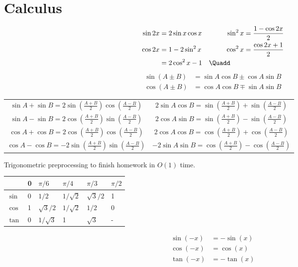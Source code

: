 \section{Calculus}\label{cbe77ad}

\label{c1fe42f}

\begin{alignat*}{3}
  \sin2x & =2\sin x\cos x & \sin^2x          & =\frac{1-\cos2x}2 \\
  \cos2x & =1-2\sin^2x    & \cos^2x          & =\frac{\cos2x+1}2 \\
         & =2\cos^2x-1    & \Quadd\quad\quad &
\end{alignat*}
\begin{align*}
  \sin(A\pm B) &=\sin A\cos B\pm\cos A\sin B \\
  \cos(A\pm B) &=\cos A\cos B\mp\sin A\sin B
\end{align*}
\begin{center}
  \renewcommand{\arraystretch}{1.5}
  \begin{tabular}{c|c}
    $\sin A+\sin B =2\sin(\frac{A+B}2)\cos(\frac{A-B}2)$  & $2\sin A\cos B=\sin(\frac{A+B}2)+\sin(\frac{A-B}2)$  \\
    $\sin A-\sin B =2\cos(\frac{A+B}2)\sin(\frac{A-B}2)$  & $2\cos A\sin B=\sin(\frac{A+B}2)-\sin(\frac{A-B}2)$  \\
    $\cos A+\cos B =2\cos(\frac{A+B}2)\cos(\frac{A-B}2)$  & $2\cos A\cos B=\cos(\frac{A+B}2)+\cos(\frac{A-B}2)$  \\
    $\cos A-\cos B =-2\sin(\frac{A+B}2)\sin(\frac{A-B}2)$ & $-2\sin A\sin B=\cos(\frac{A+B}2)-\cos(\frac{A-B}2)$
  \end{tabular}
\end{center}

\label{e1c170b}

Trigonometric preprocessing to finish homework in $O(1)$ time.

\begin{tabular}
  {|p{1cm}|p{1cm}|p{1cm}|p{1cm}|p{1cm}|p{1cm}|}
  \hline
         & 0 & $\pi/6$    & $\pi/4$    & $\pi/3$    & $\pi/2$ \\[0.2em]\hline
  $\sin$ & 0 & $1/2$      & $1/\sqrt2$ & $\sqrt3/2$ & 1       \\[0.2em]\hline
  $\cos$ & 1 & $\sqrt3/2$ & $1/\sqrt2$ & $1/2$      & 0       \\[0.2em]\hline
  $\tan$ & 0 & $1/\sqrt3$ & 1          & $\sqrt3$   & -       \\[0.2em]\hline
\end{tabular}
\begin{align*}
  \sin(-x) &=-\sin(x) \\
  \cos(-x) &=\cos(x)  \\
  \tan(-x) &=-\tan(x) \\
\end{align*}

